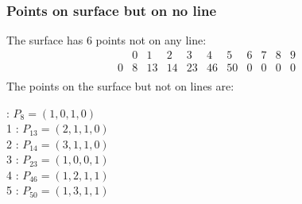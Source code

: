 \documentclass{article}
\begin{document}
{\subsubsection*{Points on surface but on no line}
The surface has 6 points not on any line:\\
$$
\begin{array}{r|*{10}{r}}
 & 0 & 1 & 2 & 3 & 4 & 5 & 6 & 7 & 8 & 9\\
\hline
0 & 8 & 13 & 14 & 23 & 46 & 50 & 0 & 0 & 0 & 0\\
\end{array}
$$
The points on the surface but not on lines are:\\
\begin{multicols}{2}
 : $P_{8}=( 1, 0, 1, 0 )$\\
1 : $P_{13}=( 2, 1, 1, 0 )$\\
2 : $P_{14}=( 3, 1, 1, 0 )$\\
3 : $P_{23}=( 1, 0, 0, 1 )$\\
4 : $P_{46}=( 1, 2, 1, 1 )$\\
5 : $P_{50}=( 1, 3, 1, 1 )$\\
\end{multicols}
}
\end{document}
